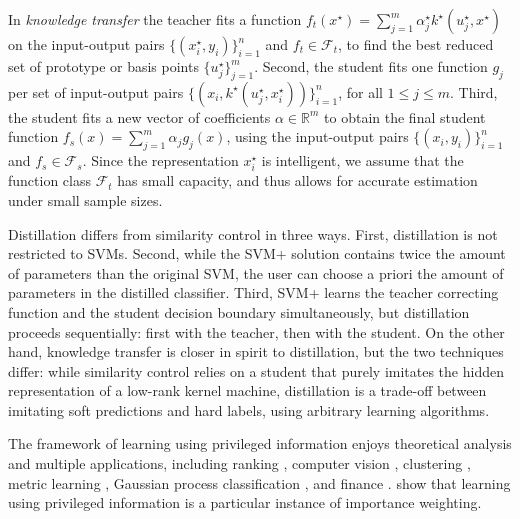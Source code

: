 \documentclass{article}
\begin{document}
In \emph{knowledge transfer} \citep{VapIzm15} the teacher fits a function
$f_t(x^\star) = \sum_{j=1}^m \alpha^\star_j k^\star(u^\star_j,x^\star)$ on the
input-output pairs $\{(x^\star_i,y_i)\}_{i=1}^n$ and $f_t \in \mathcal{F}_t$,
to find the best reduced set of prototype or basis points
$\{u^\star_j\}_{j=1}^m$.  Second, the student fits one function $g_j$ per set
of input-output pairs $\{(x_i, k^\star(u^\star_j,x^\star_i))\}_{i=1}^n$, for
all $1 \leq j \leq m$. Third, the student fits a new vector of coefficients
$\alpha \in \mathbb{R}^m$ to obtain the final student function $f_s(x) =
\sum_{j=1}^m \alpha_j g_j(x)$, using the input-output pairs
$\{(x_i,y_i)\}_{i=1}^n$ and $f_s \in \mathcal{F}_s$.  Since the representation
$x^\star_i$ is intelligent, we assume that the function class $\mathcal{F}_t$
has small capacity, and thus allows for accurate estimation under small
sample sizes.

Distillation differs from similarity control in three ways. First, distillation 
is not restricted to SVMs.  Second, while the SVM+ solution contains twice the amount
of parameters than the original SVM, the user can choose a priori the amount of parameters in the distilled
classifier. Third, SVM+ learns the teacher
correcting function and the student decision boundary simultaneously,
but distillation proceeds sequentially: first with the teacher, then with the
student.  On the other hand, knowledge transfer is closer in spirit to
distillation, but the two techniques differ: while similarity control relies on a
student that purely imitates the hidden representation of a low-rank kernel
machine, distillation is a trade-off between imitating soft predictions and hard
labels, using arbitrary learning algorithms.

The framework of learning using privileged information enjoys theoretical
analysis \citep{Pechyony10a} and multiple applications, including ranking
\citep{Sharmanska13}, computer vision \citep{Sharmanska14,Lopez-Paz14},
clustering \citep{Feyereisl12}, metric learning \citep{Fouad13}, Gaussian
process classification \citep{Hernandez14}, and finance
\citep{ribeiro2010financial}. \citet{lapin2014learning} show
that learning using privileged information is a particular instance of
importance weighting.
\end{document}
